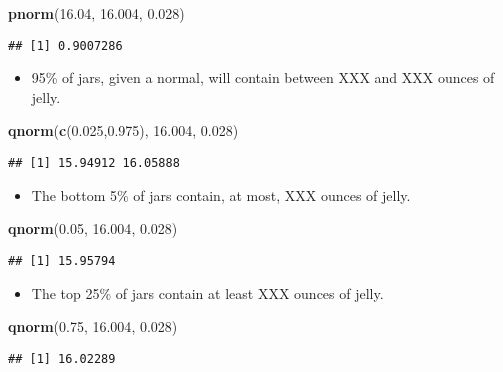 \documentclass[ignorenonframetext,]{beamer}
\newenvironment{Shaded}{\begin{snugshade}}{\end{snugshade}}
\newcommand{\FloatTok}[1]{\textcolor[rgb]{0.00,0.00,0.81}{#1}}
\newcommand{\KeywordTok}[1]{\textcolor[rgb]{0.13,0.29,0.53}{\textbf{#1}}}
\newcommand{\NormalTok}[1]{#1}
\providecommand{\tightlist}{%
  \setlength{\itemsep}{0pt}\setlength{\parskip}{0pt}}
\begin{document}
\begin{frame}[fragile]
\begin{Shaded}
\begin{Highlighting}[]
\KeywordTok{pnorm}\NormalTok{(}\FloatTok{16.04}\NormalTok{, }\FloatTok{16.004}\NormalTok{, }\FloatTok{0.028}\NormalTok{)}
\end{Highlighting}
\end{Shaded}

\begin{verbatim}
## [1] 0.9007286
\end{verbatim}

\begin{itemize}[<+->]
\tightlist
\item
  95\% of jars, given a normal, will contain between XXX and XXX ounces
  of jelly.
\end{itemize}

\begin{Shaded}
\begin{Highlighting}[]
\KeywordTok{qnorm}\NormalTok{(}\KeywordTok{c}\NormalTok{(}\FloatTok{0.025}\NormalTok{,}\FloatTok{0.975}\NormalTok{), }\FloatTok{16.004}\NormalTok{, }\FloatTok{0.028}\NormalTok{)}
\end{Highlighting}
\end{Shaded}

\begin{verbatim}
## [1] 15.94912 16.05888
\end{verbatim}

\begin{itemize}[<+->]
\tightlist
\item
  The bottom 5\% of jars contain, at most, XXX ounces of jelly.
\end{itemize}

\begin{Shaded}
\begin{Highlighting}[]
\KeywordTok{qnorm}\NormalTok{(}\FloatTok{0.05}\NormalTok{, }\FloatTok{16.004}\NormalTok{, }\FloatTok{0.028}\NormalTok{)}
\end{Highlighting}
\end{Shaded}

\begin{verbatim}
## [1] 15.95794
\end{verbatim}

\begin{itemize}[<+->]
\tightlist
\item
  The top 25\% of jars contain at least XXX ounces of jelly.
\end{itemize}

\begin{Shaded}
\begin{Highlighting}[]
\KeywordTok{qnorm}\NormalTok{(}\FloatTok{0.75}\NormalTok{, }\FloatTok{16.004}\NormalTok{, }\FloatTok{0.028}\NormalTok{)}
\end{Highlighting}
\end{Shaded}

\begin{verbatim}
## [1] 16.02289
\end{verbatim}

\end{frame}
\end{document}
